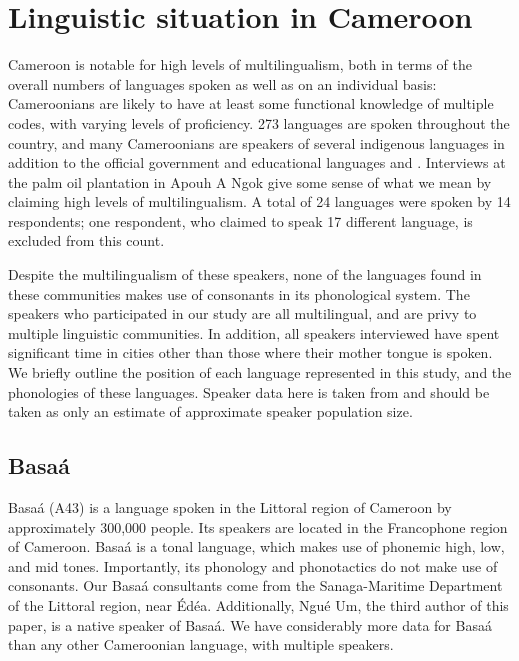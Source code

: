 \documentclass[output=paper,newtxmath,modfonts,nonflat,hidelinks]{langsci/langscibook}
\begin{document}
\section{Linguistic situation in Cameroon}

Cameroon is notable for high levels of multilingualism, both in terms of the overall numbers of languages spoken as well as on an individual basis:  Cameroonians are likely to have at least some functional knowledge of multiple codes, with varying levels of proficiency. 273 languages are spoken throughout the country, and many Cameroonians are speakers of several indigenous languages in addition to the official government and educational languages  and . Interviews at the palm oil plantation in Apouh A Ngok give some sense of what we mean by claiming high levels of multilingualism. A total of 24 languages were spoken by 14 respondents; one respondent, who claimed to speak 17 different language, is excluded from this count. 

Despite the multilingualism of these speakers, none of the languages found in these communities makes use of  consonants in its phonological system. The speakers who participated in our study  are all multilingual, and are privy to multiple linguistic communities. In addition, all speakers interviewed have spent significant time in cities other than those where their mother tongue is spoken. We  briefly outline the position of each language represented in this study, and the phonologies of these languages. Speaker data here is taken from \citet{lewisetal2016} and should be taken as only an estimate of approximate speaker population size. 

\subsection{Basa\'a}

Basa\'a (A43) is a language spoken in the Littoral region of Cameroon by approximately 300,000 people. Its speakers are located in the Francophone region of Cameroon. Basa\'a is a tonal language, which makes use of phonemic high, low, and mid tones. Importantly, its phonology and phonotactics do not make use of  consonants. Our Basa\'a consultants come from the Sanaga-Maritime Department of the Littoral region, near \'Ed\'ea. Additionally, Ngu\'{e} Um, the third author of this paper, is a native speaker of Basa\'a. We have considerably more data for Basa\'{a} than any other Cameroonian language, with multiple speakers. 
\end{document}
